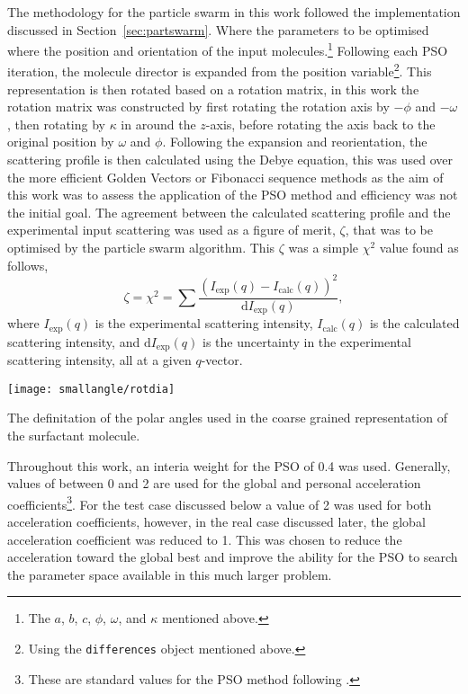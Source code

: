 The methodology for the particle swarm in this work followed the implementation discussed in Section~\ref{sec:partswarm}.
Where the parameters to be optimised where the position and orientation of the input molecules.\footnote{The $a$, $b$, $c$, $\phi$, $\omega$, and $\kappa$ mentioned above.}
Following each PSO iteration, the molecule director is expanded from the position variable\footnote{Using the \texttt{differences} object mentioned above.}.
This representation is then rotated based on a rotation matrix, in this work the rotation matrix was constructed by first rotating the rotation axis by $-\phi$ and $-\omega$, then rotating by $\kappa$ in around the $z$-axis, before rotating the axis back to the original position by $\omega$ and $\phi$.\autocite[Figure~\ref{fig:rot} defines these angles]{evans_rotations_2001}
Following the expansion and reorientation, the scattering profile is then calculated using the Debye equation,\autocite{debye_zerstreuung_1915} this was used over the more efficient Golden Vectors\autocite{watson_rapid_2013} or Fibonacci sequence\autocite{svergun_solution_1994} methods as the aim of this work was to assess the application of the PSO method and efficiency was not the initial goal.
The agreement between the calculated scattering profile and the experimental input scattering was used as a figure of merit, $\zeta$, that was to be optimised by the particle swarm algorithm.
This $\zeta$ was a simple $\chi^2$ value found as follows,
%
\begin{equation}
\zeta = \chi^2 = \sum\frac{(I_{\text{exp}}(q) - I_{\text{calc}}(q))^2}{\text{d}I_{\text{exp}}(q)},
\end{equation}
%
where $I_{\text{exp}}(q)$ is the experimental scattering intensity, $I_{\text{calc}}(q)$ is the calculated scattering intensity, and $\text{d}I_{\text{exp}}(q)$ is the uncertainty in the experimental scattering intensity, all at a given $q$-vector.
%
\begin{marginfigure}
    \centering
\texttt{[image: smallangle/rotdia]}
    \caption{The definitation of the polar angles used in the coarse grained representation of the surfactant molecule.}
    \label{fig:rot}
\end{marginfigure}
%

Throughout this work, an interia weight for the PSO of 0.4 was used.
Generally, values of between 0 and 2 are used for the global and personal acceleration coefficients\footnote{These are standard values for the PSO method following \cite{sun_study_2010}.}.
For the test case discussed below a value of 2 was used for both acceleration coefficients, however, in the real case discussed later, the global acceleration coefficient was reduced to 1.
This was chosen to reduce the acceleration toward the global best and improve the ability for the PSO to search the parameter space available in this much larger problem.

